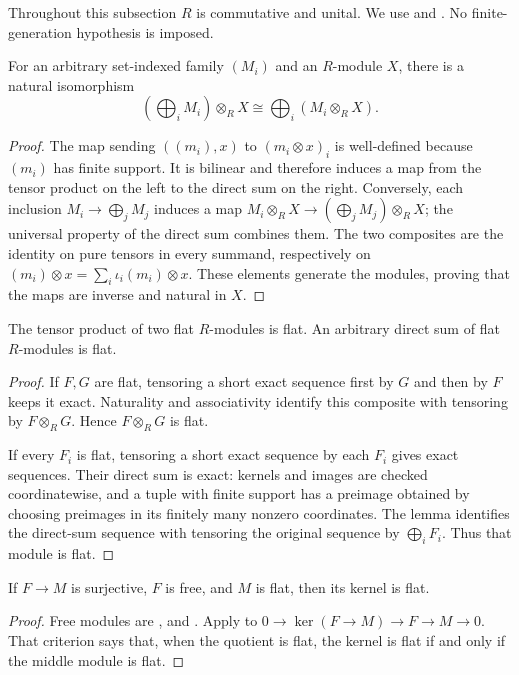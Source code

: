 Throughout this subsection $R$ is commutative and unital. We use  and . No finite-generation hypothesis is imposed.

\begin{lemma}\label{lem-tensor-direct-sum}
For an arbitrary set-indexed family $(M_i)$ and an $R$-module $X$, there is a natural isomorphism
\[
\left(\bigoplus_iM_i\right)\otimes_RX
\cong\bigoplus_i(M_i\otimes_RX).
\]
\end{lemma}
\begin{proof}\label{proof-tensor-direct-sum}
The map sending $((m_i),x)$ to $(m_i\otimes x)_i$ is well-defined because $(m_i)$ has finite support. It is bilinear and therefore induces a map from the tensor product on the left to the direct sum on the right. Conversely, each inclusion $M_i\to\bigoplus_jM_j$ induces a map $M_i\otimes_RX\to(\bigoplus_jM_j)\otimes_RX$; the universal property of the direct sum combines them. The two composites are the identity on pure tensors in every summand, respectively on $(m_i)\otimes x=\sum_i\iota_i(m_i)\otimes x$. These elements generate the modules, proving that the maps are inverse and natural in $X$.
\end{proof}

\begin{proposition}\label{prop-flat-tensor-and-sums}
The tensor product of two flat $R$-modules is flat. An arbitrary direct sum of flat $R$-modules is flat.
\end{proposition}
\begin{proof}\label{proof-flat-tensor-and-sums}
If $F,G$ are flat, tensoring a short exact sequence first by $G$ and then by $F$ keeps it exact. Naturality and associativity identify this composite with tensoring by $F\otimes_RG$. Hence $F\otimes_RG$ is flat.

If every $F_i$ is flat, tensoring a short exact sequence by each $F_i$ gives exact sequences. Their direct sum is exact: kernels and images are checked coordinatewise, and a tuple with finite support has a preimage obtained by choosing preimages in its finitely many nonzero coordinates. The lemma identifies the direct-sum sequence with tensoring the original sequence by $\bigoplus_iF_i$. Thus that module is flat.
\end{proof}

\begin{corollary}\label{cor-flat-kernel-free-surjection}
If $F\to M$ is surjective, $F$ is free, and $M$ is flat, then its kernel is flat.
\end{corollary}
\begin{proof}\label{proof-flat-kernel-free-surjection}
Free modules are , and . Apply  to $0\to\ker(F\to M)\to F\to M\to0$. That criterion says that, when the quotient is flat, the kernel is flat if and only if the middle module is flat.
\end{proof}

